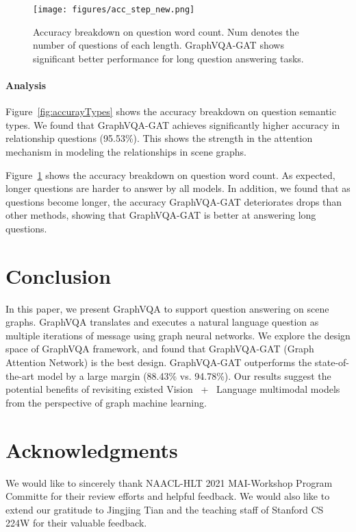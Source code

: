 \documentclass[11pt]{article}
\begin{document}
\begin{figure}[t]
    \centering
    \texttt{[image: figures/acc\_step\_new.png]}
    \caption{
    Accuracy breakdown on question word count. Num denotes the number of questions of each length. GraphVQA-GAT shows significant better performance for long question answering tasks. 
    }
    \vspace{-6mm}
    \label{fig:acc_length}
\end{figure}

\paragraph{Analysis} Figure~\ref{fig:accurayTypes} shows the accuracy breakdown on question semantic types. We found that GraphVQA-GAT achieves significantly higher accuracy in relationship questions (95.53\%). This shows the strength in the attention mechanism in modeling the relationships in scene graphs. 


Figure~\ref{fig:acc_length} shows the accuracy breakdown on question word count. As expected, longer questions are harder to answer by all models. In addition, we found that as questions become longer, the accuracy GraphVQA-GAT deteriorates drops than other methods, showing that GraphVQA-GAT is better at answering long questions. 

 
\section{Conclusion}
\label{sec:conclusion}
In this paper, we present GraphVQA to support question answering on scene graphs. GraphVQA translates and executes a natural language question as multiple iterations of message using graph neural networks. 
We explore the design space of GraphVQA framework, and found that GraphVQA-GAT (Graph Attention Network) is the best design. 
GraphVQA-GAT outperforms the state-of-the-art model by a large margin (88.43\% vs. 94.78\%). 
Our results suggest the potential benefits of revisiting existed Vision \  +  \ Language multimodal models from the perspective of graph machine learning.  


\clearpage
\section*{Acknowledgments}
We would like to sincerely thank NAACL-HLT 2021 MAI-Workshop Program Committe for their review efforts and helpful feedback. 
We would also like to extend our gratitude to Jingjing Tian and the teaching staff of Stanford CS 224W for their valuable feedback. 
\end{document}
